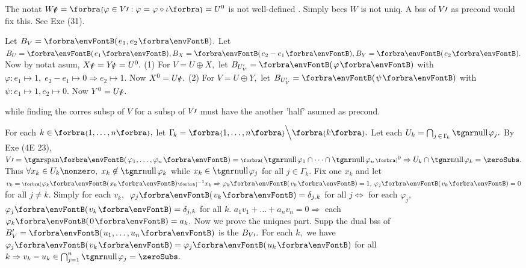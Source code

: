 \ANote The notat $W_V\upapostrophe=\Bra{\varphi\in V\apostrophe:\varphi=\varphi\circ\iota}=U^0$ is not well-defined .\parNot
Simply becs $W$ is not uniq. A bss of $V\prime$ as precond would fix this. See {\NOTEFOR} Exe (31).\par\vspace{2pt}
\AExa Let $B_V=\Par{e_1,e_2}.$ Let $B_U=\Par{e_1},B_X=\Par{e_2-e_1},B_Y=\Par{e_2}.$
Now by notat asum, $X_V\!\!\!\prime\,=Y_V\!\!\!\prime\,=U^0.$\parExa
(1) For $V=U\oplus X,$ let $B_{U_V'}=\Par{\varphi}$ with $\varphi:e_1\mapsto 1,\;e_2-e_1\mapsto 0\Rightarrow e_2\mapsto 1.$ \hfill Now $X^0=U_V\!\!\!\prime\,.$\parExa
(2) For $V=U\oplus Y,$ let $B_{U_V'}=\Par{\psi}$ with $\psi:e_1\mapsto 1,e_2\mapsto 0.$ \hfill Now $Y^0=U_V\!\!\!\prime\,.$\par\vspace{2pt}
\vspace{-3pt}\parCom
{\tgsl\normalsize while finding the corres subsp of $V$ for a subsp of $V\prime$ must have the another 'half' asumed as precond.}
\SepLine

For each $k\in\;\!\!\Bra{1,\dots,n},$ let $\Gamma_{\!k}=\Bra{1,\dots,n}\Backslash[\Big]\Bra{k}.$ Let each $U_k=\bigcap_{j\,\in\,\Gamma_{\!k}}\null\varphi_j.$\parSol{}
By Exe (4E 23), $V\apostrophe=\Span{\varphi_1,\dots,\varphi_n}=\BigPar{\null\varphi_1\cap\cdots\cap\null\varphi_n}{^0}\Rightarrow U_k\cap\null\varphi_k=\zeroSubs.$\parSol{}
Thus $\forall x_k\in U_k\nonzero,\;x_k\not\in\null\varphi_k$ while $x_k\in\null\varphi_j$ for all $j\in\Gamma_{\!k}.$\parSol{}
Fix one $x_k$ and let $v_k=\Sbra{\varphi_k\Par{x_k}}{^{-1}}x_k\Rightarrow\varphi_k\Par{v_k}=1,\,\varphi_j\Par{v_k}=0$ for all $j\neq k.$\parSol{}
Simply for each $v_k,$ \,$\varphi_j\Par{v_k}=\delta_{j,\:\!k}$ for all $j\Longleftrightarrow$ for each $\varphi_j,$ \,$\varphi_j\Par{v_k}=\delta_{j,\:\!k}$ for all $k.$\parSol{}
\又 $a_1v_1+\dots+a_nv_n=0\Rightarrow$ each $\varphi_k\Par{0}=a_k.$\vspace{2pt}\parSol{}
Now we prove the uniqnes part. Supp the dual bss of $B_V'=\Par{u_1,\dots,u_n}$ is the $B_{V\prime}.$\parSol{}
For each $k,$ we have $\varphi_j\Par{v_k}=\varphi_j\Par{u_k}$ for all $k\Rightarrow v_k-u_k\in\bigcap_{j=1}^n\null\varphi_j=\zeroSubs.$\PfEnd
\SepLine

